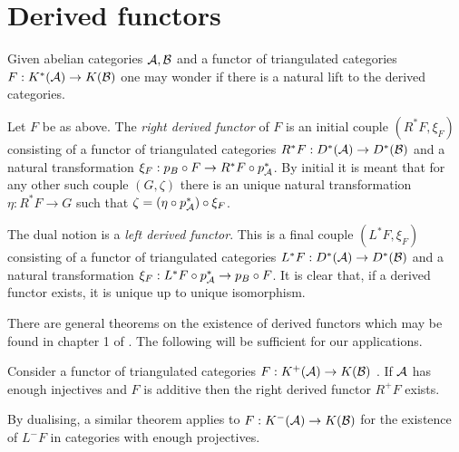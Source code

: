 \section{Derived functors}
Given abelian categories $\AA, \mathcal{B}$ and a functor of triangulated categories $F:K^*(\AA)\to K(\mathcal{B})$ one may wonder if there is a natural lift to the derived categories.
\begin{definition}
 Let $F$ be as above. The {\it right derived functor} of $F$ is an initial couple $(R^*F,\xi_F)$ consisting of a functor of triangulated categories $R^*F:D^*(\AA) \to D^*(\mathcal{B})$ and a natural transformation $\xi_F:p_B\circ F \to R^*F \circ p_\AA^*$.
 By initial it is meant that for any other such couple $(G,\zeta)$ there is an unique natural transformation $\eta: R^*F\to G$ such that $\zeta = (\eta \circ p_\AA^*)\circ \xi_{F}$.
\end{definition}
The dual notion is a {\it left derived functor}. This is a final couple $(L^*F,\xi_F)$ consisting of a functor of triangulated categories $L^*F:D^*(\AA) \to D^*(\mathcal{B})$ and a natural transformation $\xi_F:  L^*F \circ p_\AA^* \to p_B\circ F$.
It is clear that, if a derived functor exists, it is unique up to unique isomorphism.

There are general theorems on the existence of derived functors which may be found in chapter 1 of \cite{dimca2004sheaves}.
The following will be sufficient for our applications.
\begin{theorem}{\cite[Remark 1.3.15.]{dimca2004sheaves}}\label{thm: InjectivesAllowDerivedFunctor}
 Consider a functor of triangulated categories $F:K^+(\AA)\to K(\mathcal{B})$ .
 If $\AA$ has enough injectives and $F$ is additive then the right derived functor $R^+F$ exists.
\end{theorem}
By dualising, a similar theorem applies to $F:K^-(\AA)\to K(\mathcal{B})$ for the existence of $L^- F$ in categories with enough projectives.

